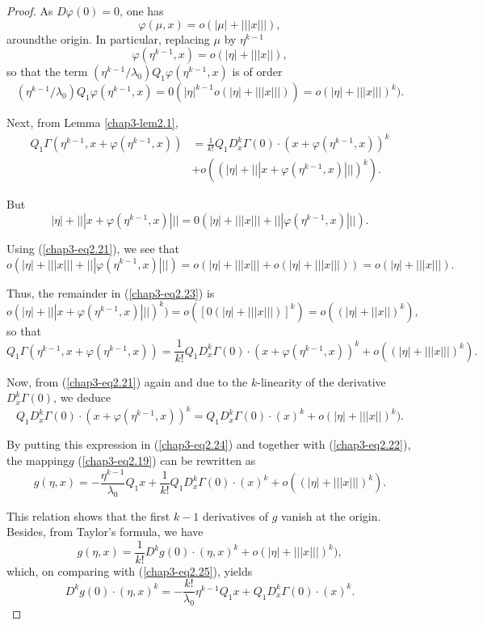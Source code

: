 \begin{proof}
As $D\varphi(0) = 0$, one has
$$
\varphi(\mu, x) = o(|\mu| + |||x|||),
$$
around\pageoriginale the origin. In particular, replacing $\mu$ by
$\eta^{k-1}$
\begin{equation*}
\varphi(\eta^{k-1}, x) = o(|\eta| + |||x||),\tag{2.21}\label{chap3-eq2.21}
\end{equation*}
so that the term $(\eta^{k-1} / \lambda_{0}) Q_{1}\varphi(\eta^{k-1},
x)$ is of order
\begin{equation*}
(\eta^{k-1}/\lambda_{0})Q_{1}\varphi(\eta^{k-1}, x) = 0(|\eta|^{k-1} o
  (|\eta| + |||x|||)) = o(|\eta| + |||x|||)^{k}).\tag{2.22}\label{chap3-eq2.22}
\end{equation*}

Next, from Lemma \ref{chap3-lem2.1},
\begin{align*}
Q_{1}\Gamma(\eta^{k-1}, x+\varphi(\eta^{k-1}, x)) & = \frac{1}{k!}
Q_{1} D_{x}^{k}\Gamma(0) \cdot (x + \varphi(\eta^{k-1}, x))^{k}\\
& + o((|\eta| + |||x + \varphi (\eta^{k-1},
x)|||)^{k}).\tag{2.23}\label{chap3-eq2.23} 
\end{align*}

But 
$$
|\eta| + |||x+\varphi(\eta^{k-1}, x)||| = 0(|\eta| + |||x||| +
|||\varphi(\eta^{k-1}, x)|||).
$$

Using (\ref{chap3-eq2.21}), we see that
$$
o(|\eta| + |||x||| + |||\varphi(\eta^{k-1}, x)|||) = o(|\eta| +
|||x||| + o(|\eta| + |||x|||)) = o(|\eta| + |||x|||).
$$

Thus, the remainder in (\ref{chap3-eq2.23}) is
$$
o(|\eta| + |||x+\varphi(\eta^{k-1}, x)|||)^{k}) = o([0(|\eta| +
  |||x|||)]^{k}) = o((|\eta| + ||x||)^{k}),
$$
so that
\begin{equation*}
Q_{1}\Gamma(\eta^{k-1}, x+\varphi(\eta^{k-1}, x)) = \frac{1}{k!}
Q_{1}D_{x}^{k}\Gamma(0) \cdot (x + \varphi(\eta^{k-1}, x))^{k} +
o((|\eta| + |||x|||)^{k}).\tag{2.24}\label{chap3-eq2.24}
\end{equation*}

Now, from (\ref{chap3-eq2.21}) again and due to the $k$-linearity of the
derivative $D_{x}^{k}\Gamma(0)$, we deduce
$$
Q_{1}D_{x}^{k}\Gamma(0) \cdot (x+\varphi(\eta^{k-1}, x))^{k} =
Q_{1}D_{x}^{k}\Gamma(0) \cdot (x)^{k} + o(|\eta| + |||x||)^{k}).
$$

By putting this expression in (\ref{chap3-eq2.24}) and together with
(\ref{chap3-eq2.22}), the mapping\pageoriginale $g$ (\ref{chap3-eq2.19})
can be rewritten as
\begin{equation*}
g(\eta, x) = -\frac{\eta^{k-1}}{\lambda_{0}} Q_{1}x +
\frac{1}{k!}Q_{1}D_{x}^{k}\Gamma(0) \cdot (x)^{k} + o((|\eta| +
|||x|||)^{k}).\tag{2.25}\label{chap3-eq2.25} 
\end{equation*}

This relation shows that the first $k - 1$ derivatives of $g$ vanish at
the origin. Besides, from Taylor's formula, we have
$$
g(\eta, x) = \frac{1}{k!} D^{k}g(0) \cdot (\eta, x)^{k} + o(|\eta| +
|||x|||)^{k}), 
$$
which, on comparing with (\ref{chap3-eq2.25}), yields
$$
D^{k}g(0) \cdot (\eta, x)^{k} = -\frac{k!}{\lambda_{0}} \eta^{k-1}
Q_{1}x + Q_{1}D_{x}^{k}\Gamma(0) \cdot (x)^{k}.
$$
\end{proof}

